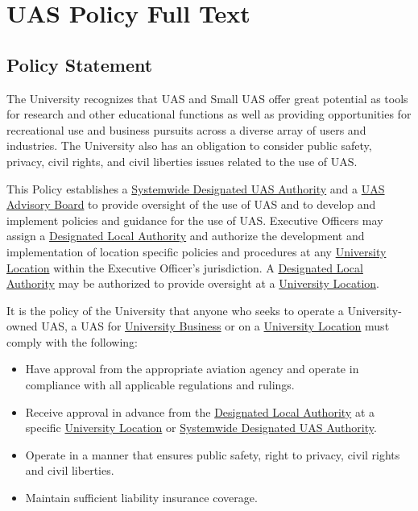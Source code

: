 \documentclass[
]{book}
\providecommand{\tightlist}{%
  \setlength{\itemsep}{0pt}\setlength{\parskip}{0pt}}
\begin{document}
\hypertarget{ch-policy-full-text}{%
\chapter{UAS Policy Full Text}\label{ch-policy-full-text}}

\hypertarget{policy-statement}{%
\section{Policy Statement}\label{policy-statement}}

The University recognizes that UAS and Small UAS offer great potential as tools for research and other educational functions as well as providing opportunities for recreational use and business pursuits across a diverse array of users and industries. The University also has an obligation to consider public safety, privacy, civil rights, and civil liberties issues related to the use of UAS.

This Policy establishes a \protect\hyperlink{SDA}{Systemwide Designated UAS Authority} and a \protect\hyperlink{AB}{UAS Advisory Board} to provide oversight of the use of UAS and to develop and implement policies and guidance for the use of UAS. Executive Officers may assign a \protect\hyperlink{DLA}{Designated Local Authority} and authorize the development and implementation of location specific policies and procedures at any \protect\hyperlink{UL}{University Location} within the Executive Officer's jurisdiction. A \protect\hyperlink{DLA}{Designated Local Authority} may be authorized to provide oversight at a \protect\hyperlink{UL}{University Location}.

It is the policy of the University that anyone who seeks to operate a University-owned UAS, a UAS for \protect\hyperlink{UB}{University Business} or on a \protect\hyperlink{UL}{University Location} must comply with the following:

\begin{itemize}
\tightlist
\item
  Have approval from the appropriate aviation agency and operate in compliance with all applicable regulations and rulings.
\item
  Receive approval in advance from the \protect\hyperlink{DLA}{Designated Local Authority} at a specific \protect\hyperlink{UL}{University Location} or \protect\hyperlink{SDA}{Systemwide Designated UAS Authority}.
\item
  Operate in a manner that ensures public safety, right to privacy, civil rights and civil liberties.
\item
  Maintain sufficient liability insurance coverage.
\end{itemize}
\end{document}

